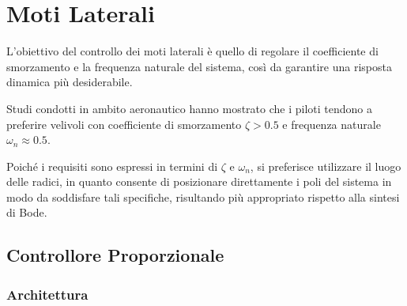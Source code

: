 \section{Moti Laterali}

L'obiettivo del controllo dei moti laterali è quello di regolare il coefficiente di smorzamento e la frequenza naturale del sistema, così da garantire una risposta dinamica più desiderabile.

Studi condotti in ambito aeronautico \cite{franklin_feedback_control} hanno mostrato che i piloti tendono a preferire velivoli con coefficiente di smorzamento $\zeta > 0.5$ e frequenza naturale $\omega_n \approx 0.5$.

Poiché i requisiti sono espressi in termini di $\zeta$ e $\omega_n$, si preferisce utilizzare il luogo delle radici, in quanto consente di posizionare direttamente i poli del sistema in modo da soddisfare tali specifiche, risultando più appropriato rispetto alla sintesi di Bode.

\subsection{Controllore Proporzionale}

\subsubsection{Architettura}

